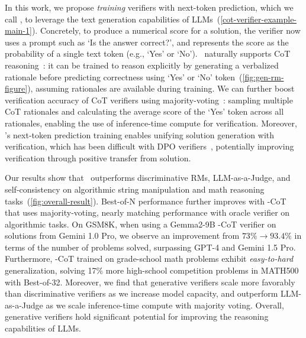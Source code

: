 \documentclass[11pt, letterpaper, logo, copyright]{googledeepmind}
\begin{document}
In this work, we propose \emph{training} verifiers with next-token prediction, which we call \textbf{\genV}, to leverage the text generation capabilities of LLMs~(\autoref{cot-verifier-example-main-1}). Concretely, to produce a numerical score for a solution, the verifier now uses a prompt such as `Is the answer correct?', and represents the score as the probability of a single text token (e.g., `Yes' or `No'). \genV\ naturally supports CoT reasoning~\citep{wei2022chain}: it can be trained to reason explicitly by generating a verbalized rationale before predicting correctness using `Yes' or `No' token~(\autoref{fig:gen-rm-figure}), assuming rationales are available during training. We can further boost verification accuracy of CoT verifiers using majority-voting~\citep{wang2022self}: sampling multiple CoT rationales and calculating the average score of the `Yes' token across all rationales, enabling the use of inference-time compute for verification. Moreover, \genV's next-token prediction training enables unifying solution generation with verification, which has been difficult with DPO verifiers~\citep{rafailov2024direct, hosseini2024v}, potentially improving verification through positive transfer from solution. 


Our results show that \genV\ outperforms discriminative RMs, LLM-as-a-Judge, and self-consistency on algorithmic string manipulation and math reasoning tasks~(\autoref{fig:overall-result}). Best-of-N performance further improves with {\genV}-CoT that uses majority-voting, nearly matching performance with oracle verifier on algorithmic tasks. On GSM8K, when using a Gemma2-9B \genV-CoT verifier on solutions from Gemini 1.0 Pro, we observe an improvement from $73\% \rightarrow 93.4\%$ in terms of the number of problems solved, surpassing GPT-4 and Gemini 1.5 Pro. Furthermore, \genV-CoT trained on grade-school math problems exhibit \emph{easy-to-hard} generalization, solving 17\% more high-school competition problems in MATH500~\citep{lightman2023let} with Best-of-32. Moreover, we find that generative verifiers scale more favorably  than discriminative verifiers as we increase model capacity, 
and outperform LLM-as-a-Judge as we scale inference-time compute with majority voting. Overall, generative verifiers hold significant potential for improving the reasoning capabilities of LLMs.
\end{document}
